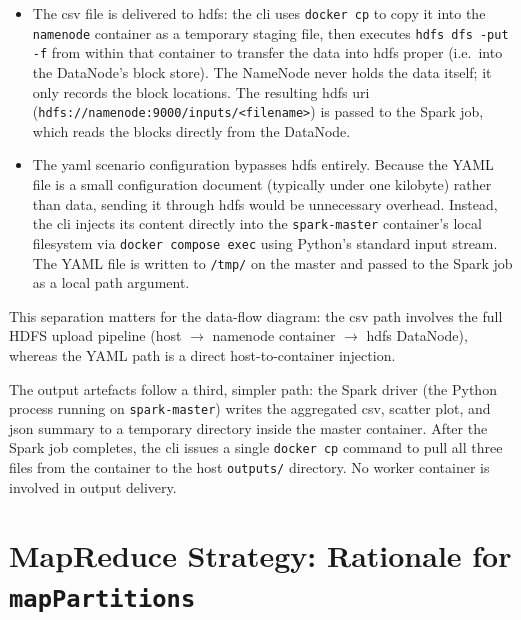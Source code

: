 \begin{itemize}
    \item The \gls{csv} file is delivered to \gls{hdfs}: the \gls{cli} uses
          \texttt{docker cp} to copy it into the \texttt{namenode} container as a temporary
          staging file, then executes \texttt{hdfs dfs -put -f} from within that container
          to transfer the data into \gls{hdfs} proper (i.e.\ into the DataNode's block
          store).  The NameNode never holds the data itself; it only records the block
          locations.  The resulting \gls{hdfs} \gls{uri}
          (\texttt{hdfs://namenode:9000/inputs/<filename>}) is passed to the Spark job,
          which reads the blocks directly from the DataNode.
    \item The \gls{yaml} scenario configuration bypasses \gls{hdfs} entirely.
          Because the YAML file is a small configuration document (typically under one
          kilobyte) rather than data, sending it through \gls{hdfs} would be unnecessary
          overhead.  Instead, the \gls{cli} injects its content directly into the
          \texttt{spark-master} container's local filesystem via \texttt{docker~compose~exec}
          using Python's standard input stream.
          The YAML file is written to \texttt{/tmp/} on the master and passed to the Spark
          job as a local path argument.
\end{itemize}

This separation matters for the data-flow diagram: the \gls{csv} path involves the full
HDFS upload pipeline (host $\to$ namenode container $\to$ \gls{hdfs} DataNode), whereas
the YAML path is a direct host-to-container injection.

The output artefacts follow a third, simpler path: the Spark driver (the Python process
running on \texttt{spark-master}) writes the aggregated \gls{csv}, scatter plot, and
\gls{json} summary to a temporary directory inside the master container.  After the Spark
job completes, the \gls{cli} issues a single \texttt{docker cp} command to pull all three
files from the container to the host \texttt{outputs/} directory.  No worker container
is involved in output delivery.

\section{MapReduce Strategy: Rationale for \texttt{mapPartitions}}
\label{sec:mapreduce-rationale}

